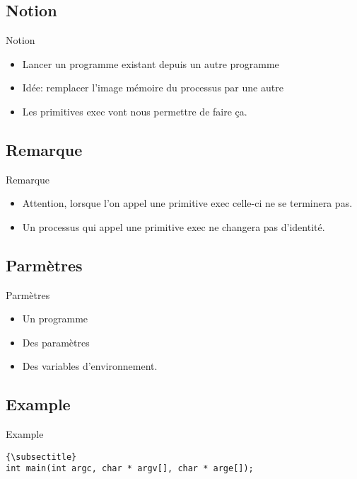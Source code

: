 \section{\sectitle}
\begin{frame}{\sectitle}
\def\subsectitle{Notion}
\subsection{\subsectitle}
\begin{block}{\subsectitle}
\begin{itemize}
\item Lancer un programme existant depuis un autre programme
\item Idée: remplacer l'image mémoire du processus par une autre
\item Les primitives exec vont nous permettre de faire ça.
\end{itemize}
\end{block}

\def\subsectitle{Remarque}
\subsection{\subsectitle}
\begin{alertblock}{\subsectitle}
\begin{itemize}
\item Attention, lorsque l'on appel une primitive exec celle-ci ne se terminera
pas.
\item Un processus qui appel une primitive exec ne changera pas d'identité.
\end{itemize}

\end{alertblock}

\end{frame}

\begin{frame}[containsverbatim]{\sectitle}
\def\subsectitle{Parmètres}
\subsection{\subsectitle}
\begin{block}{\subsectitle}
\begin{itemize}
    \item Un programme
    \item Des paramètres
    \item Des variables d'environnement.
\end{itemize}
\end{block}

\def\subsectitle{Example}
\subsection{\subsectitle}
\begin{exampleblock}{\subsectitle}
\begin{verbatim}{\subsectitle}
int main(int argc, char * argv[], char * arge[]);
\end{verbatim}
\end{exampleblock}
\end{frame}




